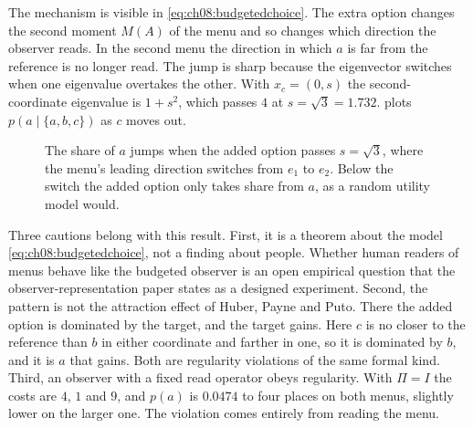 The mechanism is visible in \eqref{eq:ch08:budgetedchoice}. The extra option changes the second moment $M(A)$ of the menu and so changes which direction the observer reads. In the second menu the direction in which $a$ is far from the reference is no longer read. The jump is sharp because the eigenvector switches when one eigenvalue overtakes the other. With $x_c=(0,s)$ the second-coordinate eigenvalue is $1+s^2$, which passes $4$ at $s=\sqrt3=1.732$.  plots $p(a\mid\{a,b,c\})$ as $c$ moves out.

\begin{figure}[tbp]
\centering
{}
\caption{The share of $a$ jumps when the added option passes $s=\sqrt3$, where the menu's leading direction switches from $e_1$ to $e_2$. Below the switch the added option only takes share from $a$, as a random utility model would.}
\label{fig:ch08:jump}
\end{figure}

Three cautions belong with this result. First, it is a theorem about the model \eqref{eq:ch08:budgetedchoice}, not a finding about people. Whether human readers of menus behave like the budgeted observer is an open empirical question that the observer-representation paper states as a designed experiment. Second, the pattern is not the attraction effect of Huber, Payne and Puto. There the added option is dominated by the target, and the target gains. Here $c$ is no closer to the reference than $b$ in either coordinate and farther in one, so it is dominated by $b$, and it is $a$ that gains. Both are regularity violations of the same formal kind. Third, an observer with a fixed read operator obeys regularity. With $\Pi=I$ the costs are $4$, $1$ and $9$, and $p(a)$ is $0.0474$ to four places on both menus, slightly lower on the larger one. The violation comes entirely from reading the menu.

